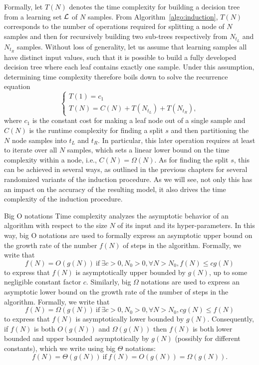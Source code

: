 Formally, let $T(N)$ denotes the time complexity for building a decision tree
from a learning set ${\cal L}$ of $N$ samples. From
Algorithm~\ref{algo:induction}, $T(N)$ corresponds to the number of operations
required for splitting a node of $N$ samples and then for recursively building
two sub-trees respectively from $N_{t_L}$ and $N_{t_R}$ samples. Without loss
of generality, let us assume that learning samples all have distinct input
values, such that it is possible to build a fully developed decision tree where
each leaf contains exactly one sample. Under this assumption, determining time
complexity therefore boils down to solve the recurrence equation
\begin{equation}\label{eqn:complexity:rec}
\begin{cases}
T(1) = c_1 \\
T(N) = C(N) + T(N_{t_L}) + T(N_{t_R}),
\end{cases}
\end{equation}
where $c_1$ is the constant cost for making a leaf node out of a single sample and $C(N)$\label{ntn:cN} is the runtime complexity for finding a split $s$ and then partitioning the $N$ node samples
into  ${t_L}$ and ${t_R}$. In particular, this later operation
requires at least to iterate over all $N$ samples, which sets a linear lower
bound on the time complexity within a node, i.e., $C(N)=\Omega(N)$. As for finding
the split $s$, this can be achieved in several ways, as outlined in the
previous chapters  for several randomized variants of the induction procedure.
As we will see, not only this has an impact on the accuracy of the resulting
model, it also drives the time complexity of the induction procedure.

\begin{remark}{Big O notations}
Time complexity analyzes the asymptotic behavior of an algorithm
with respect to the size $N$ of its input and its hyper-parameters. In this way,
big O notations are used to formally express an asymptotic upper bound on the
growth rate of the number $f(N)$ of steps in the algorithm. Formally,
we write that
\begin{equation}
f(N) =  O(g(N)) \ \text{if}\ \exists c > 0, N_0 > 0, \forall N > N_0, f(N) \leq c g(N)
\end{equation}
to express that  $f(N)$ is asymptotically upper bounded by $g(N)$, up to some negligible constant factor $c$.
Similarly, big $\Omega$ notations are used to express an asymptotic lower
bound on the growth rate of the number of steps in the algorithm. Formally,
we write that
\begin{equation}
f(N) =  \Omega(g(N)) \ \text{if}\ \exists c > 0, N_0 > 0, \forall N > N_0,  c g(N) \leq f(N)
\end{equation}
to express that $f(N)$ is asymptotically lower bounded by $g(N)$.
Consequently, if $f(N)$ is both $O(g(N))$ and $\Omega(g(N))$ then $f(N)$ is
both lower bounded and upper bounded asymptotically by $g(N)$ (possibly for different constants),
which we write using big $\Theta$ notations:
\begin{equation}
f(N) = \Theta(g(N)) \ \text{if}\  f(N) =  O(g(N)) = \Omega(g(N)).
\end{equation}
\end{remark}

